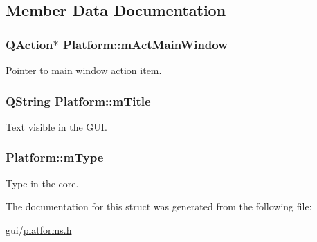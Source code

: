 \subsection{Member Data Documentation}
\hypertarget{struct_platform_af963bc84ee4722f51e58e610a83d69ca}{
\subsubsection[{m\-Act\-Main\-Window}]{\setlength{\rightskip}{0pt plus 5cm}Q\-Action$\ast$ Platform\-::m\-Act\-Main\-Window}}\label{struct_platform_af963bc84ee4722f51e58e610a83d69ca}
Pointer to main window action item. \hypertarget{struct_platform_a5d5b4b31a3bf54c1b280d3a486de6ebf}{
\subsubsection[{m\-Title}]{\setlength{\rightskip}{0pt plus 5cm}Q\-String Platform\-::m\-Title}}\label{struct_platform_a5d5b4b31a3bf54c1b280d3a486de6ebf}
Text visible in the G\-U\-I. \hypertarget{struct_platform_a9234ec239c21c7a0ccb4fc9a36e06977}{
\subsubsection[{m\-Type}]{ Platform\-::m\-Type}}\label{struct_platform_a9234ec239c21c7a0ccb4fc9a36e06977}
Type in the core. 

The documentation for this struct was generated from the following file\-:\begin{DoxyCompactItemize}
\item 
gui/\hyperlink{platforms_8h}{platforms.\-h}\end{DoxyCompactItemize}
